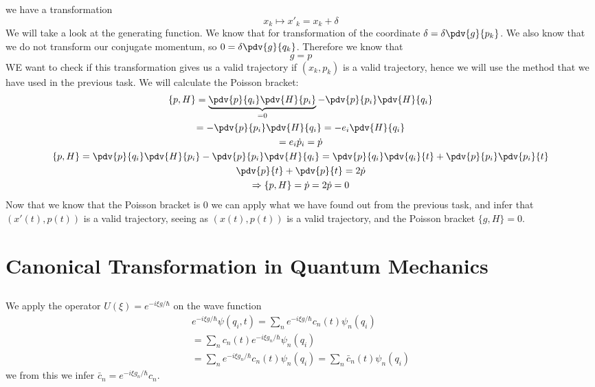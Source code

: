 \documentclass[]{scrartcl}
\begin{document}
\subsection{}

we have a transformation
$$
x_k \mapsto x'_k = x_k + \delta
$$
We will take a look at the generating function. We know that for transformation of the coordinate $\delta = \delta\pdv{g}{p_k}$. We also know that we do not transform our conjugate momentum, so $0 = \delta\pdv{g}{q_k}$. Therefore we know that
$$
g = p
$$
WE want to check if this transformation gives us a valid trajectory if $(x_k, p_k)$ is a valid trajectory, hence we will use the method that we have used in the previous task. We will calculate the Poisson bracket:
\begin{gather*}
    \{p,H\} = \underbrace{\pdv{p}{q_i}\pdv{H}{p_i}}_{=0} - \pdv{p}{p_i}\pdv{H}{q_i}\\
    = - \pdv{p}{p_i}\pdv{H}{q_i} = - e_i \pdv{H}{q_i}\\
    = e_i \dot p_i = \dot p\\
    \{p,H\} = \pdv{p}{q_i}\pdv{H}{p_i} - \pdv{p}{p_i}\pdv{H}{q_i} = \pdv{p}{q_i}\pdv{q_i}{t} + \pdv{p}{p_i}\pdv{p_i}{t}\\
    \pdv{p}{t} + \pdv{p}{t} = 2\dot p\\
    \Rightarrow \{p,H\} = \dot p = 2\dot p = 0
\end{gather*}
Now that we know that the Poisson bracket is 0 we can apply what we have found out from the previous task, and infer that $(x'(t), p(t))$ is a valid trajectory, seeing as $(x(t), p(t))$ is a valid trajectory, and the Poisson bracket $\{g,H\} =0$.



\section{Canonical Transformation in Quantum Mechanics}

\subsection{}
We apply the operator $U(\xi) = e^{-i\xi g/\hbar}$ on the wave function
\begin{gather*}
e^{-i\xi g/\hbar}\psi(q_i,t) = \sum_n e^{-i\xi g/\hbar}c_n(t)\psi_n(q_i)\\
=  \sum_n c_n(t) e^{-i\xi g_n/\hbar}\psi_n(q_i)\\
= \sum_n e^{-i\xi g_n/\hbar}c_n(t) \psi_n(q_i) = \sum_n \bar c_n(t) \psi_n(q_i)
\end{gather*}
we from this we infer $\bar c_n = e^{-i\xi g_n/\hbar}c_n$.
\end{document}
